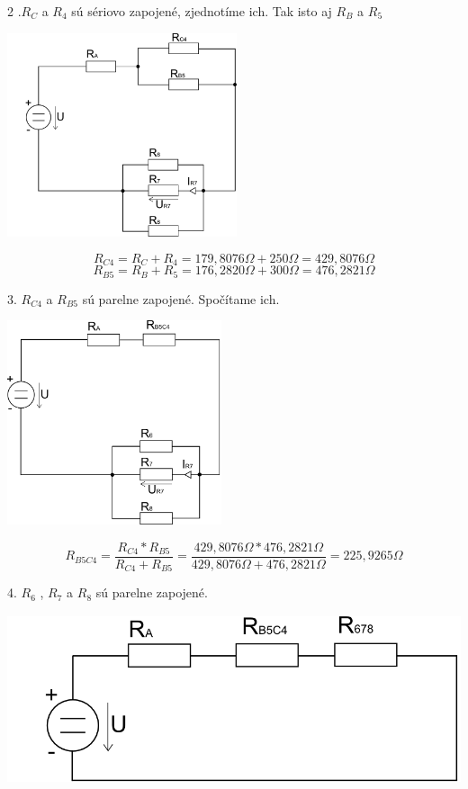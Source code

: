 \documentclass[a4paper,12pt]{article}
\begin{document}
\newpage

2 .$R_C$ a $R_4$ sú sériovo zapojené, zjednotíme ich. Tak isto aj $R_B$ a $R_5$

\includegraphics[height=6cm]{img/pr1d}

\begin{equation*}
R_{C4} = R_C + R_4 = 179,8076\Omega + 250\Omega = 429,8076\Omega
\end{equation*}
\begin{equation*}
R_{B5} = R_B + R_5 = 176,2820\Omega + 300\Omega = 476,2821\Omega
\end{equation*}

3. $R_{C4}$ a $R_{B5}$ sú parelne zapojené. Spočítame ich.

\includegraphics[height=6cm]{img/pr1e}

\begin{equation*}
R_{B5C4} = \frac{R_{C4} *  R_{B5}}{R_{C4} + R_{B5}}  = \frac{429,8076\Omega * 476,2821\Omega}{429,8076\Omega + 476,2821\Omega} = 225,9265\Omega
\end{equation*}


4. $R_6$ , $R_7$ a $R_8$ sú parelne zapojené.

\includegraphics[height=5cm]{img/pr1f}
\end{document}

